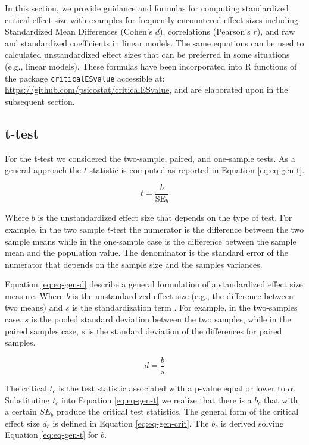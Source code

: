 \documentclass[
  man]{apa7}
\begin{document}
\color{blue} In this section, we provide guidance and formulas for computing standardized critical effect size with examples for frequently encountered effect sizes including Standardized Mean Differences (Cohen's \(d\)), correlations (Pearson's \(r\)), and raw and standardized coefficients in linear models. The same equations can be used to calculated unstandardized effect sizes that can be preferred in some situations (e.g., linear models). \color{black} These formulas have been incorporated into R functions of the package \texttt{criticalESvalue} accessible at: \url{https://github.com/psicostat/criticalESvalue}, and are elaborated upon in the subsequent section.

\hypertarget{t-test}{%
\subsection{t-test}\label{t-test}}

For the t-test we considered the two-sample, paired, and one-sample tests. As a general approach the \(t\) statistic is computed as reported in Equation \eqref{eq:eq-gen-t}.

\begin{equation}
    \label{eq:eq-gen-t}
    t = \frac{b}{\text{SE}_{b}}
\end{equation}

Where \(b\) is the unstandardized effect size that depends on the type of test. \color{blue} For example, in the two sample \(t\)-test the numerator is the difference between the two sample means while in the one-sample case is the difference between the sample mean and the population value. The denominator is the standard error of the numerator that depends on the sample size and the samples variances. \color{black}

\color{blue}

Equation \eqref{eq:eq-gen-d} describe a general formulation of a standardized effect size measure. Where \(b\) is the unstandardized effect size (e.g., the difference between two means) and \(s\) is the standardization term \color{black}. For example, in the two-samples case, \(s\) is the pooled standard deviation between the two samples, while in the paired samples case, \(s\) is the standard deviation of the differences for paired samples.

\begin{equation}
    \label{eq:eq-gen-d}
    d = \frac{b}{s}
\end{equation}

The critical \(t_c\) is the test statistic associated with a p-value equal or lower to \(\alpha\). Substituting \(t_c\) into Equation \eqref{eq:eq-gen-t} we realize that there is a \(b_c\) that with a certain \(SE_b\) produce the critical test statistics. The general form of the critical effect size \(d_c\) is defined in Equation \eqref{eq:eq-gen-crit}. The \(b_c\) is derived solving Equation \eqref{eq:eq-gen-t} for \(b\).
\end{document}
